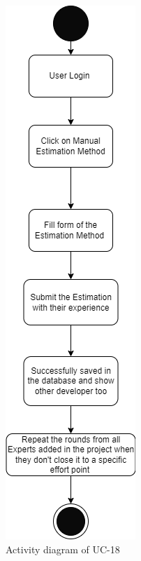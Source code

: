 \begin{figure}[H]
    \centering
    \includegraphics[scale=0.7]{./diagrams/Activity Diagram/ad-18.png}
    \caption{Activity diagram of UC-18}
    \label{fig:act-18}

\end{figure}


